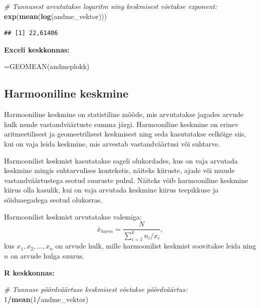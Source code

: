 \documentclass[
]{book}
\newenvironment{Shaded}{\begin{snugshade}}{\end{snugshade}}
\newcommand{\CommentTok}[1]{\textcolor[rgb]{0.56,0.35,0.01}{\textit{#1}}}
\newcommand{\DecValTok}[1]{\textcolor[rgb]{0.00,0.00,0.81}{#1}}
\newcommand{\FunctionTok}[1]{\textcolor[rgb]{0.13,0.29,0.53}{\textbf{#1}}}
\newcommand{\NormalTok}[1]{#1}
\newcommand{\SpecialCharTok}[1]{\textcolor[rgb]{0.81,0.36,0.00}{\textbf{#1}}}
\renewenvironment{Shaded} {\begin{snugshade}\footnotesize} {\end{snugshade}}
\begin{document}
\begin{Shaded}
\begin{Highlighting}[]
\CommentTok{\# Tunnusest arvutatakse logaritm ning keskmisest võetakse exponent:}
\FunctionTok{exp}\NormalTok{(}\FunctionTok{mean}\NormalTok{(}\FunctionTok{log}\NormalTok{(andme\_vektor)))}
\end{Highlighting}
\end{Shaded}

\begin{verbatim}
## [1] 22,61406
\end{verbatim}

\textbf{Exceli keskkonnas:}

\begin{Shaded}
\begin{Highlighting}[]
\NormalTok{=GEOMEAN(andmeplokk)}
\end{Highlighting}
\end{Shaded}

\subsection{Harmooniline keskmine}\label{harmooniline-keskmine}

Harmooniline keskmine on statistiline mõõde, mis arvutatakse jagades arvude hulk nende vastandväärtuste summa järgi. Harmooniline keskmine on erinev aritmeetilisest ja geomeetrilisest keskmisest ning seda kasutatakse eelkõige siis, kui on vaja leida keskmine, mis arvestab vastandväärtusi või suhtarve.

Harmoonilist keskmist kasutatakse sageli olukordades, kus on vaja arvutada keskmine mingis suhtarvulises kontekstis, näiteks kiiruste, ajade või muude vastandväärtustega seotud suuruste puhul. Näiteks võib harmooniline keskmine kiirus olla kasulik, kui on vaja arvutada keskmine kiirus teepikkuse ja sõiduaegadega seotud olukorras.

Harmoonilist keskmist arvutatakse valemiga:
\[\bar x_{harm} = \frac{N}{\sum_{i=1}^k n_i / x_i},\]
kus \(x_{1}, x_{2}, \ldots, x_{n}\) on arvude hulk, mille harmoonilist keskmist soovitakse leida ning \(n\) on arvude hulga suurus.

\textbf{R keskkonnas:}

\begin{Shaded}
\begin{Highlighting}[]
\CommentTok{\# Tunnuse pöördväärtuse keskmisest võetakse pöördväärtus:}
\DecValTok{1}\SpecialCharTok{/}\FunctionTok{mean}\NormalTok{(}\DecValTok{1}\SpecialCharTok{/}\NormalTok{andme\_vektor)}
\end{Highlighting}
\end{Shaded}
\end{document}
